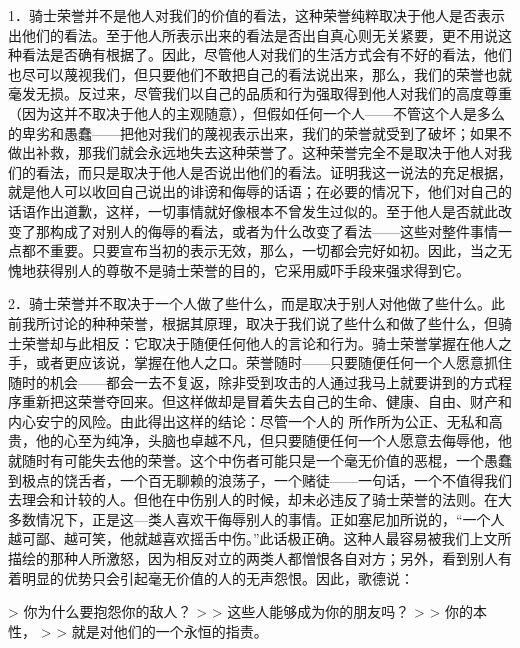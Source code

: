 \documentclass[12pt,oneside]{book}
\begin{document}
1．骑士荣誉并不是他人对我们的价值的看法，这种荣誉纯粹取决于他人是否表示出他们的看法。至于他人所表示出来的看法是否出自真心则无关紧要，更不用说这种看法是否确有根据了。因此，尽管他人对我们的生活方式会有不好的看法，他们也尽可以蔑视我们，但只要他们不敢把自己的看法说出来，那么，我们的荣誉也就毫发无损。反过来，尽管我们以自己的品质和行为强取得到他人对我们的高度尊重（因为这并不取决于他人的主观随意），但假如任何一个人——不管这个人是多么的卑劣和愚蠢——把他对我们的蔑视表示出来，我们的荣誉就受到了破坏；如果不做出补救，那我们就会永远地失去这种荣誉了。这种荣誉完全不是取决于他人对我们的看法，而只是取决于他人是否说出他们的看法。证明我这一说法的充足根据，就是他人可以收回自己说出的诽谤和侮辱的话语；在必要的情况下，他们对自己的话语作出道歉，这样，一切事情就好像根本不曾发生过似的。至于他人是否就此改变了那构成了对别人的侮辱的看法，或者为什么改变了看法——这些对整件事情一点都不重要。只要宣布当初的表示无效，那么，一切都会完好如初。因此，当之无愧地获得别人的尊敬不是骑士荣誉的目的，它采用威吓手段来强求得到它。 

2．骑士荣誉并不取决于一个人做了些什么，而是取决于别人对他做了些什么。此前我所讨论的种种荣誉，根据其原理，取决于我们说了些什么和做了些什么，但骑士荣誉却与此相反：它取决于随便任何他人的言论和行为。骑士荣誉掌握在他人之手，或者更应该说，掌握在他人之口。荣誉随时——只要随便任何一个人愿意抓住随时的机会——都会一去不复返，除非受到攻击的人通过我马上就要讲到的方式程序重新把这荣誉夺回来。但这样做却是冒着失去自己的生命、健康、自由、财产和内心安宁的风险。由此得出这样的结论：尽管一个人的
所作所为公正、无私和高贵，他的心至为纯净，头脑也卓越不凡，但只要随便任何一个人愿意去侮辱他，他就随时有可能失去他的荣誉。这个中伤者可能只是一个毫无价值的恶棍，一个愚蠢到极点的饶舌者，一个百无聊赖的浪荡子，一个赌徒——一句话，一个不值得我们去理会和计较的人。但他在中伤别人的时候，却未必违反了骑士荣誉的法则。在大多数情况下，正是这—类人喜欢干侮辱别人的事情。正如塞尼加所说的，“一个人越可鄙、越可笑，他就越喜欢摇舌中伤。”此话极正确。这种人最容易被我们上文所描绘的那种人所激怒，因为相反对立的两类人都憎恨各自对方；另外，看到别人有着明显的优势只会引起毫无价值的人的无声怨恨。因此，歌德说： 

 

> 你为什么要抱怨你的敌人？ 
>
> 这些人能够成为你的朋友吗？ 
>
> 你的本性， 
>
> 就是对他们的一个永恒的指责。 


\end{document}
